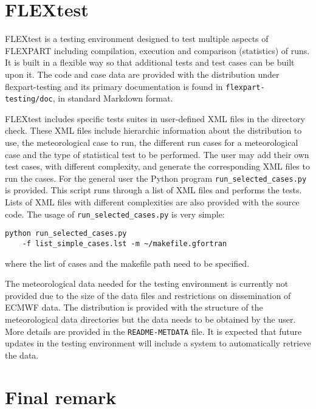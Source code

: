 \documentclass{egu}                  %
\begin{document}
\section{FLEXtest}


FLEXtest is a testing environment designed to test multiple aspects of FLEXPART including compilation, execution and comparison (statistics) of runs. It is built in a flexible way so that additional tests and test cases can be built upon it. The code and case data are provided with the distribution under flexpart-testing and its primary documentation is found in \texttt{flexpart-testing/doc}, in standard Markdown format.

FLEXtest includes specific tests suites in  user-defined XML files in the directory check. These XML files include hierarchic information about the distribution to use, the meteorological case to run, the different run cases for a meteorological case and the type of statistical test to be performed. The user may add their own test cases, with different complexity, and generate the corresponding XML files to run the cases. For the general user the Python program \texttt{run_selected_cases.py} is provided. This script runs through a list of XML files and performs the tests. Lists of XML files with different complexities are also provided with the source code. The usage of \verb|run_selected_cases.py| is very simple:

\begin{small}
\begin{verbatim}
python run_selected_cases.py 
    -f list_simple_cases.lst -m ~/makefile.gfortran
\end{verbatim}
\end{small}

where the list of cases and the makefile path need to be specified. 

The meteorological data needed for the testing environment is currently not provided due to the size of the data files and restrictions on dissemination of ECMWF data. The distribution is provided with the structure of the meteorological data directories but the data needs to be obtained by the user. More details are provided in the \verb|README-METDATA| file. It is expected that future updates in the testing environment will include a system to automatically retrieve the data. 

\section{Final remark}
\end{document}

